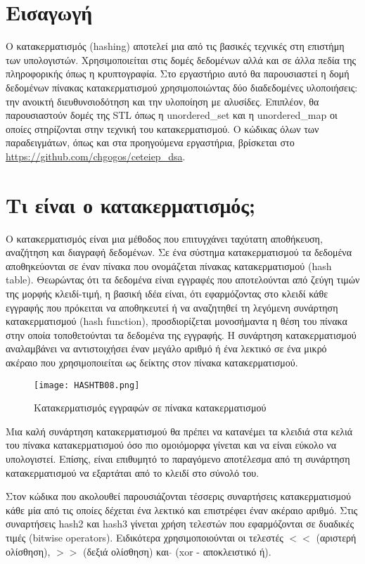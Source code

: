 \section{Εισαγωγή}
Ο κατακερματισμός (hashing) αποτελεί μια από τις βασικές τεχνικές στη επιστήμη των υπολογιστών. Χρησιμοποιείται στις δομές δεδομένων αλλά και σε άλλα πεδία της πληροφορικής όπως η κρυπτογραφία. Στο εργαστήριο αυτό θα παρουσιαστεί η δομή δεδομένων πίνακας κατακερματισμού χρησιμοποιώντας δύο διαδεδομένες υλοποιήσεις: την ανοικτή διευθυνσιοδότηση και την υλοποίηση με αλυσίδες. Επιπλέον, θα παρουσιαστούν δομές της STL όπως η unordered\_set και η unordered\_map οι οποίες στηρίζονται στην τεχνική του κατακερματισμού. Ο κώδικας όλων των παραδειγμάτων, όπως και στα προηγούμενα εργαστήρια, βρίσκεται στο \href{https://github.com/chgogos/ceteiep_dsa}{https://github.com/chgogos/ceteiep\_dsa}.

\section{Τι είναι ο κατακερματισμός;}
Ο κατακερματισμός είναι μια μέθοδος που επιτυγχάνει ταχύτατη αποθήκευση, αναζήτηση και διαγραφή δεδομένων. Σε ένα σύστημα κατακερματισμού τα δεδομένα αποθηκεύονται σε έναν πίνακα που ονομάζεται πίνακας κατακερματισμού (hash table). Θεωρώντας ότι τα δεδομένα είναι εγγραφές που αποτελούνται από ζεύγη τιμών της μορφής κλειδί-τιμή, η βασική ιδέα είναι, ότι εφαρμόζοντας στο κλειδί κάθε εγγραφής που πρόκειται να αποθηκευτεί ή να αναζητηθεί τη λεγόμενη συνάρτηση κατακερματισμού (hash function), προσδιορίζεται μονοσήμαντα η θέση του πίνακα στην οποία τοποθετούνται τα δεδομένα της εγγραφής. Η συνάρτηση κατακερματισμού αναλαμβάνει να αντιστοιχήσει έναν μεγάλο αριθμό ή ένα λεκτικό σε ένα μικρό ακέραιο που χρησιμοποιείται ως δείκτης στον πίνακα κατακερματισμού.

\begin{figure}[ht]
\centering
\texttt{[image: HASHTB08.png]}
\caption{Κατακερματισμός εγγραφών σε πίνακα κατακερματισμού \cite{wiki_hashtables}}
\label{fig:hashtable1}
\end{figure}

Μια καλή συνάρτηση κατακερματισμού θα πρέπει να κατανέμει τα κλειδιά στα κελιά του πίνακα κατακερματισμού όσο πιο ομοιόμορφα γίνεται και να είναι εύκολο να υπολογιστεί. Επίσης, είναι επιθυμητό το παραγόμενο αποτέλεσμα από τη συνάρτηση κατακερματισμού να εξαρτάται από το κλειδί στο σύνολό του.

Στον κώδικα που ακολουθεί παρουσιάζονται τέσσερις συναρτήσεις κατακερματισμού κάθε μία από τις οποίες δέχεται ένα λεκτικό και επιστρέφει έναν ακέραιο αριθμό. Στις συναρτήσεις hash2 και hash3 γίνεται χρήση τελεστών που εφαρμόζονται σε δυαδικές τιμές (bitwise operators). Ειδικότερα χρησιμοποιούνται οι τελεστές $<<$ (αριστερή ολίσθηση), $>>$ (δεξιά ολίσθηση) και $\hat{}$ (xor - αποκλειστικό ή).

